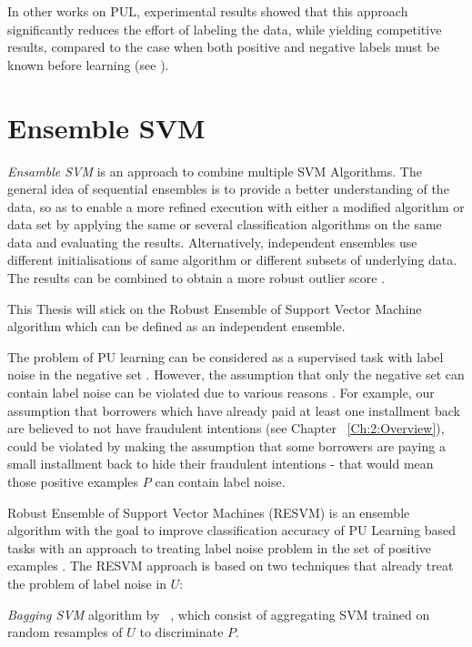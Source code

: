In other works on PUL, experimental results showed that this approach significantly reduces the effort of labeling the data, while yielding competitive results, compared to the case when both positive and negative labels must be known before learning (see \cite{Li:2011}).

\section{Ensemble SVM}\label{Chapter:Ensemble}
\textit{Ensamble SVM} is an approach to combine multiple SVM Algorithms. The general idea of sequential ensembles is to provide a better understanding of the data, so as to enable a more refined execution with either a modified algorithm or data set \cite{Aggarwal:2013} by applying the same or several classification algorithms on the same data and evaluating the results. Alternatively, independent ensembles use different initialisations of same algorithm or different subsets of underlying data. The results can be combined to obtain a more robust outlier score \cite{Aggarwal:2013}. 

This Thesis will stick on the Robust Ensemble of Support Vector Machine algorithm \cite{Claesen:2014} which can be defined as an independent ensemble.

The problem of PU learning can be considered as a supervised task with label noise in the negative set \cite{Claesen:2014}. However, the assumption that only the negative set can contain label noise can be violated due to various reasons \cite{journals/tnn/FrenayV14}. For example, our assumption that borrowers which have already paid at least one installment back are believed to not have fraudulent intentions (see Chapter ~\ref{Ch:2:Overview}), could be violated by making the assumption that some borrowers are paying a small installment back to hide their fraudulent intentions - that would mean those positive examples \(P\) can contain label noise.

Robust Ensemble of Support Vector Machines (RESVM) is an ensemble algorithm with the goal to improve classification accuracy of PU Learning based tasks with an approach to treating label noise problem in the set of positive examples \cite{Claesen:2014}. The RESVM approach is based on two techniques that already treat the problem of label noise in \(U\):

\textit{Bagging SVM} algorithm by ~\cite{journals/prl/MordeletV14}, which consist of aggregating SVM trained on random resamples of \(U\) to discriminate \(P\). 

